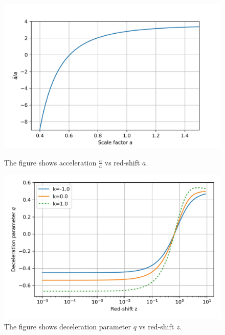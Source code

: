 \documentclass[8pt,hideothersubsections]{beamer}
\begin{document}
{\begin{frame}
\begin{figure}[ht]
    \begin{minipage}{0.49\linewidth}
        \centering
        \includegraphics[width=\textwidth]{./Images/UDF_addot.jpg}
		\caption{The figure shows acceleration $\frac{\ddot{a}}{a}$ vs red-shift $a$.}
		\label{fig:ch_ddot}
    \end{minipage}
    \begin{minipage}{0.49\linewidth}
        \centering
        \includegraphics[width=\textwidth]{./Images/UDF_q.jpg}
		\caption{The figure shows deceleration parameter $q$ vs red-shift $z$.}
		\label{fig:Chq}
    \end{minipage}
\end{figure}
\end{frame}
}
\end{document}
